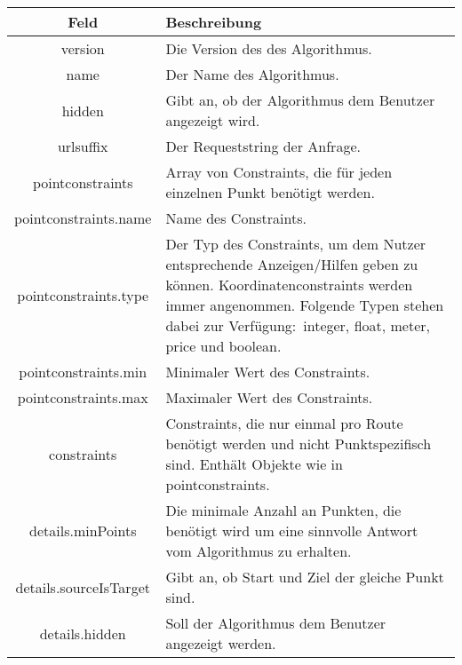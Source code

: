 \documentclass[ngerman,titlepage,parskip=true]{scrartcl}
\begin{document}
    \noindent \begin{tabular}{|c|p{11.5cm}|}
    	\hline
    	\textbf{Feld} & \textbf{Beschreibung} \\ 
    	\hline \hline
    	
    	version & Die Version des des Algorithmus. \\ 
    	\hline
    	
    	name & Der Name des Algorithmus. \\
    	\hline
    	
    	hidden & Gibt an, ob der Algorithmus dem Benutzer angezeigt wird. \\
    	\hline
    	
    	urlsuffix & Der Requeststring der Anfrage. \\
    	\hline
    	
    	pointconstraints & Array von Constraints, die für jeden einzelnen Punkt benötigt werden. \\
    	\hline
    	
    	pointconstraints.name & Name des Constraints. \\
    	\hline
    	
    	pointconstraints.type & Der Typ des Constraints, um dem Nutzer entsprechende Anzeigen/Hilfen geben zu können. Koordinatenconstraints werden immer angenommen. Folgende Typen stehen dabei zur Verfügung:\ integer, float, meter, price und boolean.\\ 
    	\hline
    	
    	pointconstraints.min & Minimaler Wert des Constraints. \\
    	\hline
    	
    	pointconstraints.max & Maximaler Wert des Constraints. \\
    	\hline
    	
    	constraints & Constraints, die nur einmal pro Route benötigt werden und nicht Punktspezifisch sind. Enthält Objekte wie in pointconstraints. \\
    	\hline
    	
    	details.minPoints & Die minimale Anzahl an Punkten, die benötigt wird um eine sinnvolle Antwort vom Algorithmus zu erhalten.\\ 
		\hline
		
		details.sourceIsTarget & Gibt an, ob Start und Ziel der gleiche Punkt sind.\\    		\hline    		
    	details.hidden & Soll der Algorithmus dem Benutzer angezeigt werden.\\ 
		\hline

   	\end{tabular}
   	\clearpage
\end{document}
